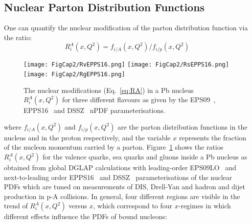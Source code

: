 \subsection{Nuclear Parton Distribution Functions}
\label{sec:nPDFs}
One can quantify the nuclear modification of the parton distribution function via the ratio:
\begin{equation}
\label{eq:RA}
R_i^A(x,Q^2) = f_{i/A}(x,Q^2) / f_{i/p}(x,Q^2)
\end{equation}
\begin{figure}[!ht]
  \centering
  \texttt{[image: FigCap2/RvEPPS16.png]}
  \texttt{[image: FigCap2/RsEPPS16.png]}
  \texttt{[image: FigCap2/RgEPPS16.png]}
  \caption{The nuclear modifications (Eq.~\ref{eq:RA}) in a Pb nucleus $R_i^A(x,Q^2)$ for three different flavours as given by the EPS09~\cite{Sassot:2009sh}, EPPS16~\cite{Eskola:2016oht} and DSSZ~\cite{deFlorian:2011fp} nPDF parameterisations.}
  \label{fig:nPDF}
\end{figure}
where $f_{i/A}(x,Q^2)$ and $f_{i/p}(x,Q^2)$ are the parton distribution functions in the 
nucleus and in the proton respectively, and the variable $x$ represents the fraction of 
the nucleon momentum carried by a parton. Figure~\ref{fig:nPDF} 
shows the ratios $R_i^A(x,Q^2)$ for the valence quarks, sea quarks and 
gluons inside a Pb nucleus as obtained from global DGLAP 
calculations with leading-order EPS09LO~\cite{Eskola:2009uj} and next-to-leading order 
EPPS16~\cite{Eskola:2016oht} and DSSZ~\cite{deFlorian:2011fp}
parameterisations of the nuclear PDFs which are tuned on measurements
of DIS, Drell-Yan and hadron and dijet production in p-A collisions. 
In general, four different regions are visible in the trend of $R_i^A(x,Q^2)$ versus $x$,
which correspond to four $x$-regimes in which different 
effects influence the PDFs of bound nucleons:
